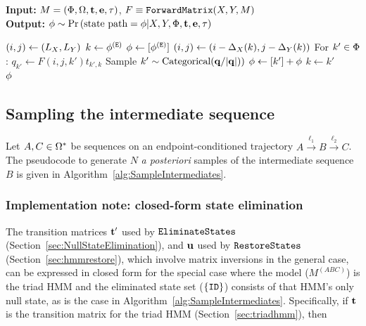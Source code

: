 \documentclass{article}
\newcommand\prob[1]{\mbox{Pr}\left( #1 \right)}
\newcommand\seclabel[1]{\label{sec:#1}}
\newcommand\secref[1]{Section~\ref{sec:#1}}
\newcommand\alglabel[1]{\label{alg:#1}}
\newcommand\algoref[1]{Algorithm~\ref{alg:#1}}
\newcommand\algrequire[1]{\textbf{Input:} #1 \\}
\newcommand\algensure[1]{\textbf{Output:} #1 \\}
\begin{document}
\begin{algorithm}
\caption{$\forwardtraceback(M,F)$}
\alglabel{Traceback}
\algrequire{$M=(\Phi,\Omega,{\bf t},{\bf e},\tau)$,
$F \equiv {\tt ForwardMatrix}(X,Y,M)$}
\algensure{$\statepath \sim \prob{\mbox{state path}=\statepath|\seqx,\seqy,\states,{\bf t},{\bf e},\statetype}$}
\begin{algorithmic}
\State $(i,j) \gets (L_X,L_Y)$
\State $k \gets \phi^{({\tt E})}$
\State $\phi \gets [\phi^{({\tt E})}]$
  \State $(i,j) \gets (i-\Delta_{X}(k),j-\Delta_{Y}(k))$
  \State For $k' \in \Phi$: $q_{k'} \gets F(i,j,k') t_{k',k}$
  \State Sample $k' \sim \mbox{Categorical}({\bf q} / |{\bf q}|))$
  \State $\phi \gets [k'] + \phi$
  \State $k \gets k'$
\EndWhile
\\
\Return $\phi$
\end{algorithmic}
\end{algorithm}

\subsection{Sampling the intermediate sequence}

Let $A,C \in \Omega^\ast$ be sequences on an endpoint-conditioned trajectory
$A \xrightarrow{\ell_1} B \xrightarrow{\ell_2} C$.
The pseudocode to generate $N$ {\em a posteriori} samples of the intermediate sequence $B$
is given in \algoref{SampleIntermediates}.

\newcommand\acsup{{(AC)}}
\newcommand\absup{{(AB)}}
\newcommand\bcsup{{(BC)}}
\newcommand\abcsup{{(ABC)}}

\subsubsection{Implementation note: closed-form state elimination}
\seclabel{ClosedFormStateElim}

The transition matrices ${\bf t}'$ used by ${\tt EliminateStates}$
(\secref{NullStateElimination}),
and ${\bf u}$ used by ${\tt RestoreStates}$
(\secref{hmmrestore}),
which involve matrix inversions in the general case,
can be expressed in closed form for the special case where the model ($M^\abcsup$) is the triad HMM
and the eliminated state set ($\{{\tt ID}\}$) consists of that HMM's only null state,
as is the case in \algoref{SampleIntermediates}.
Specifically, if ${\bf t}$ is the transition matrix for the triad HMM
(\secref{triadhmm}), then
\end{document}
